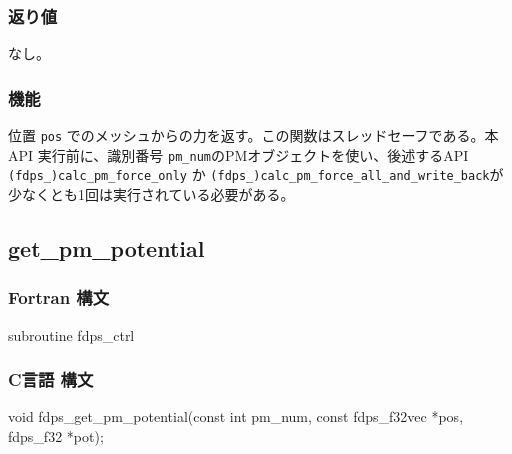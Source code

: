 \subsubsection*{返り値}
なし。

\subsubsection*{機能}
位置 \texttt{pos} でのメッシュからの力を返す。この関数はスレッドセーフである。本 API 実行前に、識別番号 \texttt{pm\_num}のPMオブジェクトを使い、後述するAPI \texttt{(fdps\_)calc\_pm\_force\_only} か \texttt{(fdps\_)calc\_pm\_force\_all\_and\_write\_back}が少なくとも1回は実行されている必要がある。
\clearpage

\subsection{get\_pm\_potential}

\subsubsection*{Fortran 構文}
\begin{screen}
\begin{spverbatim}
subroutine fdps_ctrl%
\end{spverbatim}
\end{screen}

\subsubsection*{C言語 構文}
\begin{screen}
\begin{spverbatim}
void fdps_get_pm_potential(const int pm_num,
                           const fdps_f32vec *pos,
                           fdps_f32 *pot);
\end{spverbatim}
\end{screen}

